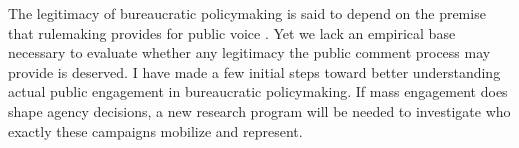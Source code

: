 

The legitimacy of bureaucratic policymaking is said to depend on the premise that rulemaking provides for public voice \citep{Croley2003, Rosenbloom2003}. Yet we lack an empirical base necessary to evaluate whether any legitimacy the public comment process may provide is deserved. I have made a few initial steps toward better understanding actual public engagement in bureaucratic policymaking.
If mass engagement does shape agency decisions, a new research program will be needed to investigate who exactly these campaigns mobilize and represent.

